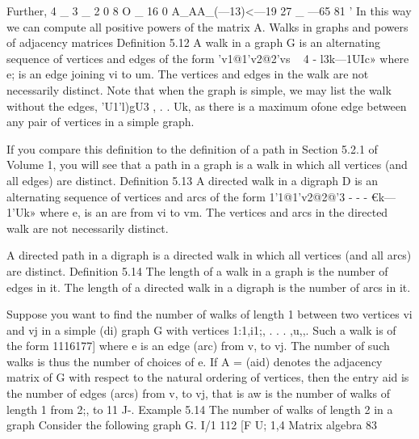 \documentclass{beamer}
\begin{document}
\begin{frame}
\begin{frame}
Further,
4 _ 3 _ 2 0 8 O _ 16 0
A_AA_(—13)<—19 27 _ —65 81 '
In this way we can compute all positive powers of the matrix A.
Walks in graphs and powers of adjacency matrices
Definition 5.12 A walk in a graph G is an alternating sequence of
vertices and edges of the form
’v1@1'v2@2’vs ~ 4 - l3k—1UIc»
where e; is an edge joining vi to um. The vertices and edges in the
walk are not necessarily distinct.
Note that when the graph is simple, we may list the walk without the
edges,
’U1'l)gU3 , . . Uk,
as there is a maximum ofone edge between any pair of vertices in a
simple graph.
\end{frame}
\begin{frame}
If you compare this deﬁnition to the deﬁnition of a path in Section
5.2.1 of Volume 1, you will see that a path in a graph is a walk in
which all vertices (and all edges) are distinct.
Definition 5.13 A directed walk in a digraph D is an alternating
sequence of vertices and arcs of the form
1'1@1'v2@2@'3 - - - €k—1'Uk»
where e, is an are from vi to vm. The vertices and arcs in the directed
walk are not necessarily distinct.
\end{frame}
\begin{frame}
A directed path in a digraph is a directed walk in which all vertices
(and all arcs) are distinct.
Definition 5.14 The length of a walk in a graph is the number of edges
in it. The length of a directed walk in a digraph is the number of
arcs in it.
\end{frame}
\begin{frame}
Suppose you want to ﬁnd the number of walks of length 1 between
two vertices vi and vj in a simple (di) graph G with vertices
1:1,i1;, . . . ,u,,. Such a walk is of the form 1116177] where e is an edge
(arc) from v, to vj. The number of such walks is thus the number of
choices of e. If A = (aid) denotes the adjacency matrix of G with
respect to the natural ordering of vertices, then the entry aid is the
number of edges (arcs) from v, to vj, that is aw is the number of
walks of length 1 from 2;, to 11 J-.
Example 5.14 The number of walks of length 2 in a graph
Consider the following graph G.
I/1 112
[F
U; 1,4
Matrix algebra
83


\end{frame}
\end{frame}
\end{document}

